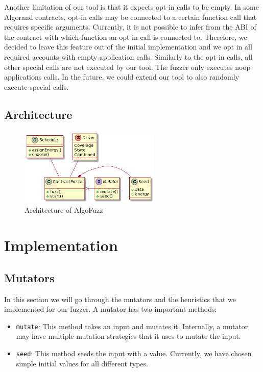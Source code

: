 Another limitation of our tool is that it expects opt-in calls to be empty.
In some Algorand contracts, opt-in calls may be connected to a certain function call that requires specific arguments.
Currently, it is not possible to infer from the \ac{ABI} of the contract with which function an opt-in call is connected to.
Therefore, we decided to leave this feature out of the initial implementation and we opt in all required accounts with empty application calls.
Similarly to the opt-in calls, all other special calls are not executed by our tool.
The fuzzer only executes noop applications calls.
In the future, we could extend our tool to also randomly execute special calls.

\subsection*{Architecture}

\begin{figure}[htbp]
    \centering
    \includegraphics[width=0.6\textwidth]{figures/algofuzz-architecture-simple.png}
    \caption{Architecture of AlgoFuzz}\label{fig:algofuzz-architecture}
\end{figure}

\section{Implementation}

\subsection*{Mutators} \label{section:mutators}
In this section we will go through the mutators and the heuristics that we implemented for our fuzzer.
A mutator has two important methods:
\begin{itemize}
    \item \texttt{mutate}: This method takes an input and mutates it.
          Internally, a mutator may have multiple mutation strategies that it uses to mutate the input.
    \item \texttt{seed}: This method seeds the input with a value.
          Currently, we have chosen simple initial values for all different types.
\end{itemize}


